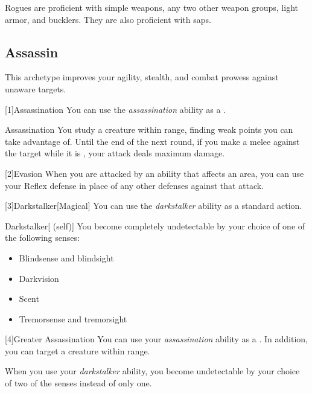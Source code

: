         Rogues are proficient with simple weapons, any two other weapon groups, light armor, and bucklers.
        They are also proficient with saps.

    \subsection{Assassin}
        This archetype improves your agility, stealth, and combat prowess against unaware targets.

        [1]{Assassination} You can use the \textit{assassination} ability as a .
        \begin{freeability}{Assassination}
            You study a creature within \rngclose range, finding weak points you can take advantage of.
            Until the end of the next round, if you make a melee  against the target while it is \unaware, your attack deals maximum damage.
        \end{freeability}

        [2]{Evasion} When you are attacked by an ability that affects an area, you can use your Reflex defense in place of any other defenses against that attack.

        [3]{Darkstalker}[Magical] You can use the \textit{darkstalker} ability as a standard action.
        \begin{attuneability}{Darkstalker}[ (self)]
            You become completely undetectable by your choice of one of the following senses:
            \begin{itemize}
                \item Blindsense and blindsight
                \item Darkvision
                \item Scent
                \item Tremorsense and tremorsight
            \end{itemize}
        \end{attuneability}

        [4]{Greater Assassination} You can use your \textit{assassination} ability as a .
        In addition, you can target a creature within \rnglong range.

         When you use your \textit{darkstalker} ability, you become undetectable by your choice of two of the senses instead of only one.

